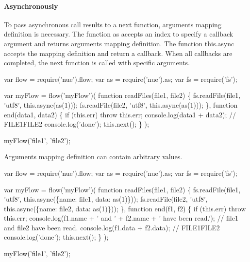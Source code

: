 \paragraph*{Asynchronously}

To pass asynchronous call results to a next function, arguments mapping definition is necessary. The function {\ttfamily as} accepts an index to specify a callback argument and returns arguments mapping definition. The function {\ttfamily this.\+async} accepts the mapping definition and return a callback. When all callbacks are completed, the next function is called with specific arguments.


\begin{DoxyCode}
var flow = require(\textcolor{stringliteral}{'nue'}).flow;
var as = require(\textcolor{stringliteral}{'nue'}).as;
var fs = require(\textcolor{stringliteral}{'fs'});

var myFlow = flow(\textcolor{stringliteral}{'myFlow'})(
  \textcolor{keyword}{function} readFiles(file1, file2) \{
    fs.readFile(file1, \textcolor{stringliteral}{'utf8'}, this.async(as(1)));
    fs.readFile(file2, \textcolor{stringliteral}{'utf8'}, this.async(as(1)));
  \},
  \textcolor{keyword}{function} end(data1, data2) \{
    \textcolor{keywordflow}{if} (this.err) \textcolor{keywordflow}{throw} this.err;
    console.log(data1 + data2); \textcolor{comment}{// FILE1FILE2}
    console.log(\textcolor{stringliteral}{'done'});
    this.next();
  \}
);

myFlow(\textcolor{stringliteral}{'file1'}, \textcolor{stringliteral}{'file2'});
\end{DoxyCode}


Arguments mapping definition can contain arbitrary values.


\begin{DoxyCode}
var flow = require(\textcolor{stringliteral}{'nue'}).flow;
var as = require(\textcolor{stringliteral}{'nue'}).as;
var fs = require(\textcolor{stringliteral}{'fs'});

var myFlow = flow(\textcolor{stringliteral}{'myFlow'})(
  \textcolor{keyword}{function} readFiles(file1, file2) \{
    fs.readFile(file1, \textcolor{stringliteral}{'utf8'}, this.async(\{name: file1, data: as(1)\}));
    fs.readFile(file2, \textcolor{stringliteral}{'utf8'}, this.async(\{name: file2, data: as(1)\}));
  \},
  \textcolor{keyword}{function} end(f1, f2) \{
    \textcolor{keywordflow}{if} (this.err) \textcolor{keywordflow}{throw} this.err;
    console.log(f1.name + \textcolor{stringliteral}{' and '} + f2.name + \textcolor{stringliteral}{' have been read.'}); \textcolor{comment}{// file1 and file2 have been read.}
    console.log(f1.data + f2.data); \textcolor{comment}{// FILE1FILE2}
    console.log(\textcolor{stringliteral}{'done'});
    this.next();
  \}
);

myFlow(\textcolor{stringliteral}{'file1'}, \textcolor{stringliteral}{'file2'});
\end{DoxyCode}


